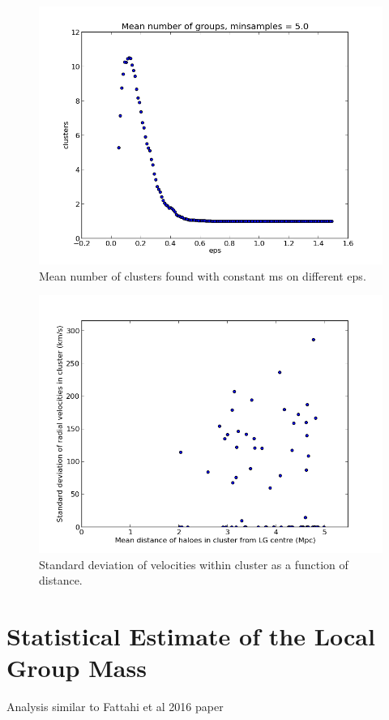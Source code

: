 \documentclass[english, oneside]{HYgradu}
\begin{document}
\begin{figure}
   \centering
   \includegraphics[width=\textwidth]{kuvat/ms-5.png}
   \caption{Mean number of clusters found with constant ms on different eps.}\label{fig:mseffect}
\end{figure}

\begin{figure}
   \centering
   \includegraphics[width=\textwidth]{kuvat/diststd-113.png}
   \caption{Standard deviation of velocities within cluster as a function of distance.}\label{fig:diststd}
\end{figure}

\section{Statistical Estimate of the Local Group Mass}
Analysis similar to Fattahi et al 2016 paper
\end{document}
